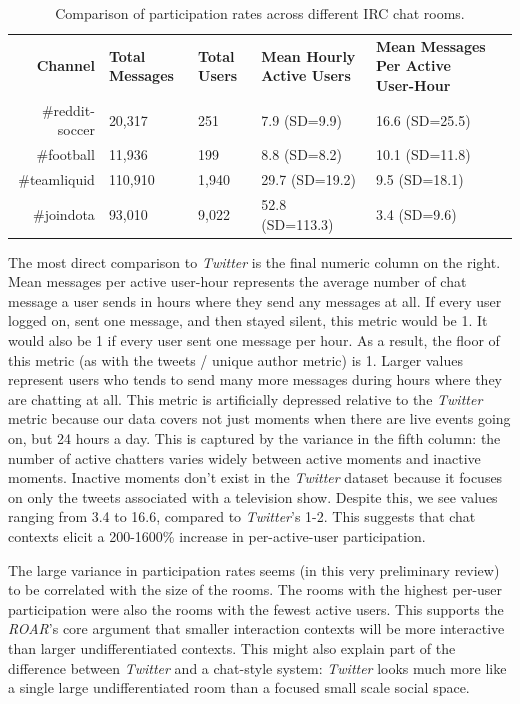 \begin{table}[tb]
\begin{tabular}{r|lllll}
\textbf{Channel} & \textbf{Total Messages} & \textbf{Total Users} & \textbf{Mean Hourly Active Users} & \textbf{Mean  Messages Per Active User-Hour} \\

\#reddit-soccer & 20,317 & 251 & 7.9 (SD=9.9) & 16.6 (SD=25.5) \\
\#football & 11,936 & 199 & 8.8 (SD=8.2) & 10.1 (SD=11.8) \\
\#teamliquid & 110,910 & 1,940 & 29.7 (SD=19.2) & 9.5 (SD=18.1) \\
\#joindota & 93,010 & 9,022 & 52.8 (SD=113.3) & 3.4 (SD=9.6) \\
	
\end{tabular}
\label{tab:chat_message_rates}
\caption{Comparison of participation rates across different IRC chat rooms.}
\end{table}

The most direct comparison to \emph{Twitter} is the final numeric column on the right. Mean messages per active user-hour represents the average number of chat message a user sends in hours where they send any messages at all. If every user logged on, sent one message, and then stayed silent, this metric would be 1. It would also be 1 if every user sent one message per hour. As a result, the floor of this metric (as with the tweets / unique author metric) is 1. Larger values represent users who tends to send many more messages during hours where they are chatting at all. This metric is artificially depressed relative to the \emph{Twitter} metric because our data covers not just moments when there are live events going on, but 24 hours a day. This is captured by the variance in the fifth column: the number of active chatters varies widely between active moments and inactive moments. Inactive moments don't exist in the \emph{Twitter} dataset because it focuses on only the tweets associated with a television show. Despite this, we see values ranging from 3.4 to 16.6, compared to \emph{Twitter}'s 1-2. This suggests that chat contexts elicit a 200-1600\% increase in per-active-user participation. 

The large variance in participation rates seems (in this very preliminary review) to be correlated with the size of the rooms. The rooms with the highest per-user participation were also the rooms with the fewest active users. This supports the \emph{ROAR}'s core argument that smaller interaction contexts will be more interactive than larger undifferentiated contexts. This might also explain part of the difference between \emph{Twitter} and a chat-style system: \emph{Twitter} looks much more like a single large undifferentiated room than a focused small scale social space.

